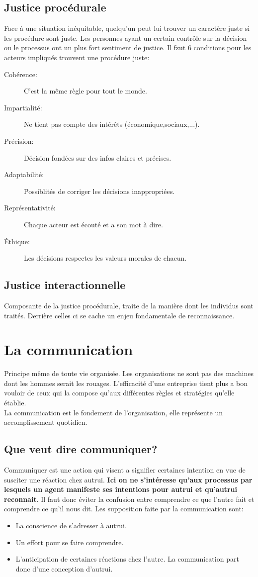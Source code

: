 \documentclass[11pt]{article} %
\begin{document}
	\subsection{Justice procédurale}
		Face à une situation inéquitable, quelqu'un peut lui trouver un caractère juste si les procédure sont 
		juste. Les personnes ayant un certain contrôle sur la décision ou le processus ont un plus fort 
		sentiment de justice. Il fzut 6 conditions pour les acteurs impliqués trouvent une procédure juste:
		\begin{description}
			\item[Cohérence:] C'est la même règle pour tout le monde.
			\item[Impartialité: ] Ne tient pas compte des intérêts (économique,sociaux,...).
			\item[Précision: ] Décision fondées sur des infos claires et précises.
			\item[Adaptabilité: ] Possiblités de corriger les décisions inappropriées.
			\item[Représentativité: ] Chaque acteur est écouté et a son mot à dire.
			\item[Éthique: ] Les décisions respectes les valeurs morales de chacun.
		\end{description}
	\subsection{Justice interactionnelle}
		Composante de la justice procédurale, traite de la manière dont les individus sont traités. Derrière 
		celles ci se cache un enjeu fondamentale de reconnaissance.
\section{La communication}
	Principe même de toute vie organisée. Les organisations ne sont pas des machines dont les hommes serait
	les rouages. L'efficacité d'une entreprise tient plus a bon vouloir de ceux qui la compose qu'aux différentes
	règles et stratégies qu'elle établie. \\
	La communication est le fondement de l'organisation, elle représente un accomplissement quotidien.
	\subsection{Que veut dire communiquer?}
		Communiquer est une action qui visent a signifier certaines intention en vue de susciter une réaction 
		chez autrui. \textbf{Ici on ne s'intéresse qu'aux processus par lesquels un agent manifeste ses 
		intentions pour autrui et qu'autrui reconnait}. Il faut donc éviter la confusion entre comprendre ce que 
		l'autre fait et comprendre ce qu'il nous dit. Les supposition faite par la communication sont:
		\begin{itemize}
			\item La conscience de s'adresser à autrui.
			\item Un effort pour se faire comprendre.
			\item L'anticipation de certaines réactions chez l'autre. La communication part donc d'une 
			conception d'autrui.
		\end{itemize}
\end{document}
